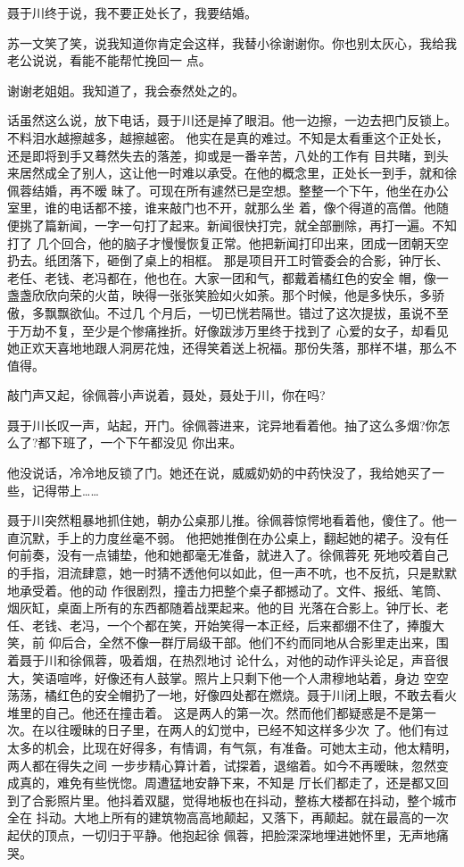 \documentclass[11pt,a4paper,onecolumn]{article}
\begin{document}
聂于川终于说，我不要正处长了，我要结婚。

苏一文笑了笑，说我知道你肯定会这样，我替小徐谢谢你。你也别太灰心，我给我老公说说，看能不能帮忙挽回一
点。

谢谢老姐姐。我知道了，我会泰然处之的。

话虽然这么说，放下电话，聂于川还是掉了眼泪。他一边擦，一边去把门反锁上。不料泪水越擦越多，越擦越密。
他实在是真的难过。不知是太看重这个正处长，还是即将到手又蓦然失去的落差，抑或是一番辛苦，八处的工作有
目共睹，到头来居然成全了别人，这让他一时难以承受。在他的概念里，正处长一到手，就和徐佩蓉结婚，再不暧
昧了。可现在所有遽然已是空想。整整一个下午，他坐在办公室里，谁的电话都不接，谁来敲门也不开，就那么坐
着，像个得道的高僧。他随便挑了篇新闻，一字一句打了起来。新闻很快打完，就全部删除，再打一遍。不知打了
几个回合，他的脑子才慢慢恢复正常。他把新闻打印出来，团成一团朝天空扔去。纸团落下，砸倒了桌上的相框。
那是项目开工时管委会的合影，钟厅长、老任、老钱、老冯都在，他也在。大家一团和气，都戴着橘红色的安全
帽，像一盏盏欣欣向荣的火苗，映得一张张笑脸如火如荼。那个时候，他是多快乐，多骄傲，多飘飘欲仙。不过几
个月后，一切已恍若隔世。错过了这次提拔，虽说不至于万劫不复，至少是个惨痛挫折。好像跋涉万里终于找到了
心爱的女子，却看见她正欢天喜地地跟人洞房花烛，还得笑着送上祝福。那份失落，那样不堪，那么不值得。

敲门声又起，徐佩蓉小声说着，聂处，聂处\myrule{}于川，你在吗?

聂于川长叹一声，站起，开门。徐佩蓉进来，诧异地看着他。抽了这么多烟?你怎么了?都下班了，一个下午都没见
你出来。

他没说话，冷冷地反锁了门。她还在说，威威奶奶的中药快没了，我给她买了一些，记得带上……

聂于川突然粗暴地抓住她，朝办公桌那儿推。徐佩蓉惊愕地看着他，傻住了。他一直沉默，手上的力度丝毫不弱。
他把她推倒在办公桌上，翻起她的裙子。没有任何前奏，没有一点铺垫，他和她都毫无准备，就进入了。徐佩蓉死
死地咬着自己的手指，泪流肆意，她一时猜不透他何以如此，但一声不吭，也不反抗，只是默默地承受着。他的动
作很剧烈，撞击力把整个桌子都撼动了。文件、报纸、笔筒、烟灰缸，桌面上所有的东西都随着战栗起来。他的目
光落在合影上。钟厅长、老任、老钱、老冯，一个个都在笑，开始笑得一本正经，后来都绷不住了，捧腹大笑，前
仰后合，全然不像一群厅局级干部。他们不约而同地从合影里走出来，围着聂于川和徐佩蓉，吸着烟，在热烈地讨
论什么，对他的动作评头论足，声音很大，笑语喧哗，好像还有人鼓掌。照片上只剩下他一个人肃穆地站着，身边
空空荡荡，橘红色的安全帽扔了一地，好像四处都在燃烧。聂于川闭上眼，不敢去看火堆里的自己。他还在撞击着。
这是两人的第一次。然而他们都疑惑是不是第一次。在以往暧昧的日子里，在两人的幻觉中，已经不知这样多少次
了。他们有过太多的机会，比现在好得多，有情调，有气氛，有准备。可她太主动，他太精明，两人都在得失之间
一步步精心算计着，试探着，退缩着。如今不再暧昧，忽然变成真的，难免有些恍惚。周遭猛地安静下来，不知是
厅长们都走了，还是都又回到了合影照片里。他抖着双腿，觉得地板也在抖动，整栋大楼都在抖动，整个城市全在
抖动。大地上所有的建筑物高高地颠起，又落下，再颠起。就在最高的一次起伏的顶点，一切归于平静。他抱起徐
佩蓉，把脸深深地埋进她怀里，无声地痛哭。
\end{document}
